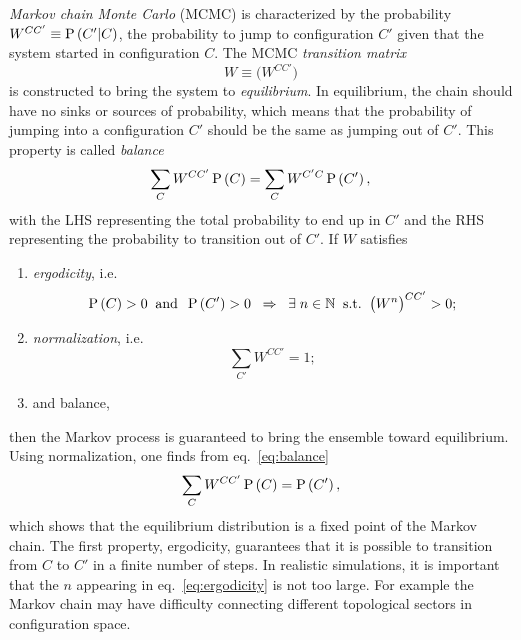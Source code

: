 {\it Markov chain Monte Carlo} (MCMC) is characterized by the probability 
$W^{CC'}\equiv\operatorname{P}\left(C'|C\right)$, the probability to jump to configuration 
$C'$ given that the system started in configuration $C$.
The MCMC {\it transition matrix}
\begin{equation}
  W\equiv\Big(W^{CC'}\Big)
\end{equation}
is constructed to bring the system to {\it equilibrium}.
In equilibrium, the chain should have no sinks or sources of probability,
which means that the probability of jumping into a configuration $C'$
should be the same as jumping out of $C'$. This property
is called {\it balance}
\begin{equation}\label{eq:balance}
    \sum\limits_CW^{CC'}\operatorname{P}\left(C\right)=
    \sum\limits_CW^{C'C}\operatorname{P}\left(C'\right),
\end{equation}
with the LHS representing the total probability to end up in $C'$ and
the RHS representing the probability to transition out of $C'$.
If $W$ satisfies
\begin{enumerate}
  \item {\it ergodicity}, i.e.
        \begin{equation}\label{eq:ergodicity}
          \operatorname{P}\left(C\right)>0\;\;\text{and}\;\;\operatorname{P}\left(C'\right)>0\;\;\Rightarrow\;\;
          \exists\;n\in\mathbb{N}\;\;\text{s.t.}\;\;\big(W^n\big)^{CC'}>0;
        \end{equation}
  \item {\it normalization}, i.e.
        \begin{equation}
          \sum\limits_{C'}W^{CC'}=1;
        \end{equation}
  \item and balance, 
\end{enumerate}
then the Markov process is guaranteed to bring the ensemble toward 
equilibrium. Using normalization, one finds from eq.~\eqref{eq:balance}
\begin{equation}\index{balance}
    \sum\limits_CW^{CC'}\pr{C}=\pr{C'},
\end{equation}
which shows that the equilibrium distribution is a fixed point of
the Markov chain. The first property, ergodicity, guarantees that it
is possible to transition from $C$ to $C'$ in a finite number of steps.
In realistic simulations, it is important that the $n$ appearing in
eq.~\eqref{eq:ergodicity} is not too large. For example 
the Markov chain may have difficulty connecting different topological sectors
in configuration space.

